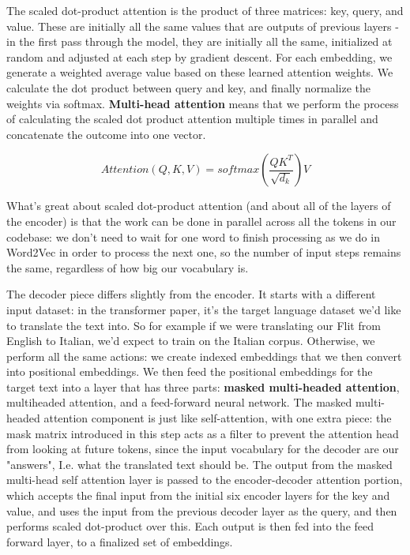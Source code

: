 \documentclass[11pt, table]{diazessay} %
\begin{document}
\begin{sloppypar}
The scaled dot-product attention is  the product of three matrices: key, query, and value. These are initially all the same values that are outputs of previous layers - in the first pass through the model, they are initially all the same, initialized at random and adjusted at each step by gradient descent. For each embedding, we generate a weighted average value based on these learned attention weights. We calculate the dot product between query and key, and finally normalize the weights via softmax. \textbf{Multi-head attention} means that we perform the process of calculating the scaled dot product attention multiple times in parallel and concatenate the outcome into one vector.

\begin{equation}
Attention(Q, K, V) = softmax(\frac{QK^T}{\sqrt{d_k}})V
\end{equation}

What's great about scaled dot-product attention (and about all of the layers of the encoder) is that the work can be done in parallel across all the tokens in our codebase: we don't need to wait for one word to finish processing as we do in Word2Vec in order to process the next one, so the number of input steps remains the same, regardless of how big our vocabulary is.

The decoder piece differs slightly from the encoder. It starts with a different input dataset: in the transformer paper, it's the target language dataset we'd like to translate the text into.  So for example if we were translating our Flit from English to Italian, we'd expect to train on the Italian corpus. Otherwise, we perform all the same actions: we create indexed embeddings that we then convert into positional embeddings. We then feed the positional embeddings for the target text into a layer that has three parts: \textbf{masked multi-headed attention}, multiheaded attention, and a feed-forward neural network. The masked multi-headed attention component is just like self-attention, with one extra piece: the mask matrix introduced in this step acts as a filter to prevent the attention head from looking at future tokens, since the input vocabulary for the decoder are our "answers", I.e. what the translated text should be. The output from the masked multi-head self attention layer is passed to the encoder-decoder attention portion, which accepts the final input from the initial six encoder layers for the key and value, and uses the input from the previous decoder layer as the query, and then performs scaled dot-product over this. Each output is then fed into the feed forward layer, to a finalized set of embeddings.


\end{sloppypar}
\end{document}

